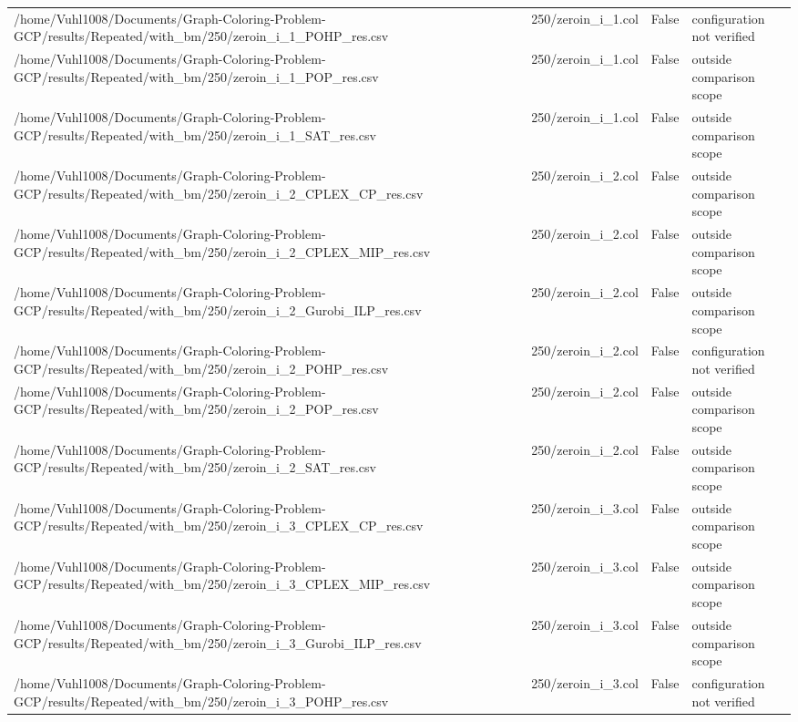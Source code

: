\begin{table}[htbp]
\begin{tabular}{llll}
/home/Vuhl1008/Documents/Graph-Coloring-Problem-GCP/results/Repeated/with\_bm/250/zeroin\_i\_1\_POHP\_res.csv & 250/zeroin\_i\_1.col & False & configuration not verified \\
/home/Vuhl1008/Documents/Graph-Coloring-Problem-GCP/results/Repeated/with\_bm/250/zeroin\_i\_1\_POP\_res.csv & 250/zeroin\_i\_1.col & False & outside comparison scope \\
/home/Vuhl1008/Documents/Graph-Coloring-Problem-GCP/results/Repeated/with\_bm/250/zeroin\_i\_1\_SAT\_res.csv & 250/zeroin\_i\_1.col & False & outside comparison scope \\
/home/Vuhl1008/Documents/Graph-Coloring-Problem-GCP/results/Repeated/with\_bm/250/zeroin\_i\_2\_CPLEX\_CP\_res.csv & 250/zeroin\_i\_2.col & False & outside comparison scope \\
/home/Vuhl1008/Documents/Graph-Coloring-Problem-GCP/results/Repeated/with\_bm/250/zeroin\_i\_2\_CPLEX\_MIP\_res.csv & 250/zeroin\_i\_2.col & False & outside comparison scope \\
/home/Vuhl1008/Documents/Graph-Coloring-Problem-GCP/results/Repeated/with\_bm/250/zeroin\_i\_2\_Gurobi\_ILP\_res.csv & 250/zeroin\_i\_2.col & False & outside comparison scope \\
/home/Vuhl1008/Documents/Graph-Coloring-Problem-GCP/results/Repeated/with\_bm/250/zeroin\_i\_2\_POHP\_res.csv & 250/zeroin\_i\_2.col & False & configuration not verified \\
/home/Vuhl1008/Documents/Graph-Coloring-Problem-GCP/results/Repeated/with\_bm/250/zeroin\_i\_2\_POP\_res.csv & 250/zeroin\_i\_2.col & False & outside comparison scope \\
/home/Vuhl1008/Documents/Graph-Coloring-Problem-GCP/results/Repeated/with\_bm/250/zeroin\_i\_2\_SAT\_res.csv & 250/zeroin\_i\_2.col & False & outside comparison scope \\
/home/Vuhl1008/Documents/Graph-Coloring-Problem-GCP/results/Repeated/with\_bm/250/zeroin\_i\_3\_CPLEX\_CP\_res.csv & 250/zeroin\_i\_3.col & False & outside comparison scope \\
/home/Vuhl1008/Documents/Graph-Coloring-Problem-GCP/results/Repeated/with\_bm/250/zeroin\_i\_3\_CPLEX\_MIP\_res.csv & 250/zeroin\_i\_3.col & False & outside comparison scope \\
/home/Vuhl1008/Documents/Graph-Coloring-Problem-GCP/results/Repeated/with\_bm/250/zeroin\_i\_3\_Gurobi\_ILP\_res.csv & 250/zeroin\_i\_3.col & False & outside comparison scope \\
/home/Vuhl1008/Documents/Graph-Coloring-Problem-GCP/results/Repeated/with\_bm/250/zeroin\_i\_3\_POHP\_res.csv & 250/zeroin\_i\_3.col & False & configuration not verified \\

\end{tabular}
\end{table}
